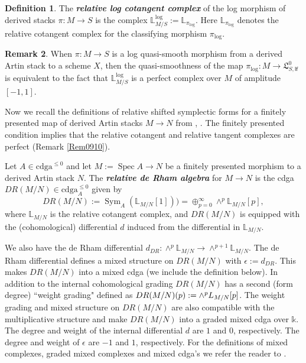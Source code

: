 \documentclass[11pt]{amsart}
\newcommand  {\cdga}     {\mathrm{cdga}}
\DeclareMathOperator{\Sym}{Sym}
\DeclareMathOperator{\Spec}{Spec}
\theoremstyle{plain}
\numberwithin{equation}{section}
\theoremstyle{definition}
\newtheorem{Def}{Definition}[section]
\newtheorem{Rem}[Def]{Remark}
\theoremstyle{plain}
\begin{document}
\smallskip

\begin{Def}{\cite[Definition 2.12]{Pr}}
The \emph{\bfseries relative log cotangent complex} of the log morphism of derived stacks $\pi : M \to S$ is the complex ${\mathbb {L}}^{\log}_{M/S}:=\mathbb L_{\pi_{\log}}$. Here $\mathbb L_{\pi_{\log}}$ denotes the relative cotangent complex for the classifying  morphism $\pi_{\log}$.
\end{Def}

\smallskip


\begin{Rem} When $\pi : M \to S$ is a log quasi-smooth morphism from a derived Artin stack to a scheme $X$, then the quasi-smoothness  of the  map $\pi_{\log}: M\longrightarrow \mathfrak L^0_{S, \mathsf{lf}}$ is equivalent to the fact that ${\mathbb L}^{\log}_{M/S}$ is a perfect complex over $M$ of amplitude $[-1, 1]$.
\end{Rem}

Now we recall the definitions of relative shifted symplectic forms for a finitely presented map of derived Artin stacks $M\longrightarrow N$ from \cite{PTVV}, \cite[Definition 1.4.1]{CPTVV}. The finitely presented condition implies that the relative cotangent and relative tangent complexes are perfect (Remark \ref{Rem0910}). 

\smallskip


Let $A \in \cdga^{\leq 0}$ and let $M:=\Spec A\longrightarrow N$ be a finitely presented morphism to a derived Artin stack $N$. The  \emph{\bfseries relative de Rham algebra} for $M \to N$ is the cdga $DR(M/N) \in \cdga^{\leq 0}_{A}$ given by 
\begin{equation}
DR(M/N):=\Sym_A(\mathbb L_{M/N}[1])) = \oplus^{\infty}_{p=0} \wedge^p \mathbb L_{M/N}[p],
\end{equation}
where $\mathbb L_{M/N}$ is the relative cotangent complex, and $DR(M/N)$ is equipped with the  (cohomological) differential $d$ induced from the differential in $\mathbb L_{M/N}$. 

\smallskip

\noindent
We also have the de Rham differential $d_{DR}: \wedge^p \mathbb L_{M/N}\longrightarrow \wedge^{p+1} \mathbb L_{M/N}$. The de Rham differential defines a mixed structure on $DR(M/N)$ with $\epsilon:=d_{DR}$. This makes $DR(M/N)$ into a mixed cdga (we include the definition below). In addition to the internal cohomological grading $DR(M/N)$ has a second (form degree) ``weight grading" defined as $DR(M/N)(p):= \wedge^p \mathbb \mathbb L_{M/N}[p]$. The weight grading and mixed structure on $DR(M/N)$ are also compatible with the multiplicative structure and make $DR(M/N)$ into a graded mixed cdga over $\mathbb k$. The degree and weight of the internal differential $d$ are $1$ and $0$, respectively. The degree and weight of $\epsilon$ are $-1$ and $1$, respectively. For the definitions of mixed complexes, graded mixed complexes and mixed cdga's we refer the reader to \cite[Section 1.1]{PTVV}. 
\end{document}
